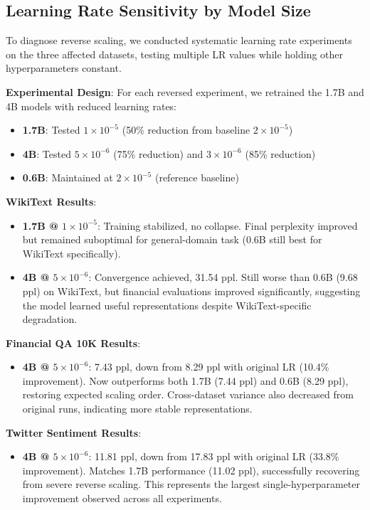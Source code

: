 \subsection{Learning Rate Sensitivity by Model Size}

To diagnose reverse scaling, we conducted systematic learning rate experiments on the three affected datasets, testing multiple LR values while holding other hyperparameters constant.

\textbf{Experimental Design}: For each reversed experiment, we retrained the 1.7B and 4B models with reduced learning rates:
\begin{itemize}
\item \textbf{1.7B}: Tested $1 \times 10^{-5}$ (50\% reduction from baseline $2 \times 10^{-5}$)
\item \textbf{4B}: Tested $5 \times 10^{-6}$ (75\% reduction) and $3 \times 10^{-6}$ (85\% reduction)
\item \textbf{0.6B}: Maintained at $2 \times 10^{-5}$ (reference baseline)
\end{itemize}

\textbf{WikiText Results}:
\begin{itemize}
\item \textbf{1.7B @ $1 \times 10^{-5}$}: Training stabilized, no collapse. Final perplexity improved but remained suboptimal for general-domain task (0.6B still best for WikiText specifically).
\item \textbf{4B @ $5 \times 10^{-6}$}: Convergence achieved, 31.54 ppl. Still worse than 0.6B (9.68 ppl) on WikiText, but financial evaluations improved significantly, suggesting the model learned useful representations despite WikiText-specific degradation.
\end{itemize}

\textbf{Financial QA 10K Results}:
\begin{itemize}
\item \textbf{4B @ $5 \times 10^{-6}$}: 7.43 ppl, down from 8.29 ppl with original LR (10.4\% improvement). Now outperforms both 1.7B (7.44 ppl) and 0.6B (8.29 ppl), restoring expected scaling order. Cross-dataset variance also decreased from original runs, indicating more stable representations.
\end{itemize}

\textbf{Twitter Sentiment Results}:
\begin{itemize}
\item \textbf{4B @ $5 \times 10^{-6}$}: 11.81 ppl, down from 17.83 ppl with original LR (33.8\% improvement). Matches 1.7B performance (11.02 ppl), successfully recovering from severe reverse scaling. This represents the largest single-hyperparameter improvement observed across all experiments.
\end{itemize}

